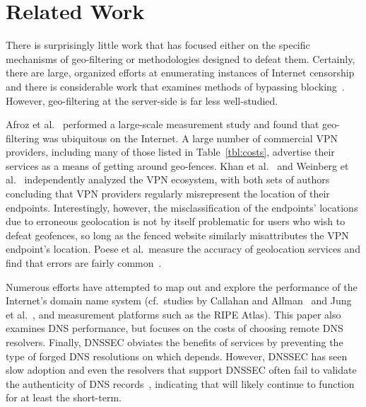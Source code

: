 \section{Related Work}

There is surprisingly little work that has focused either on the
specific mechanisms of geo-filtering or methodologies
designed to defeat them.  Certainly, there are large,
organized efforts at enumerating instances of Internet
censorship~\cite{encore,filasto2012ooni,echo-censorship} and there is
considerable work that examines methods of bypassing
blocking~\cite{tor,censorship-sok,censorship-empirical-study}.  However,
geo-filtering at the server-side is far less well-studied.

Afroz et al.~\cite{afroz2018exploring} performed a large-scale
measurement study and found that geo-filtering was ubiquitous on the
Internet.  A large number of commercial VPN providers, including many
of those listed in Table~\ref{tbl:costs}, advertise their services as
a means of getting around geo-fences.  Khan et
al.~\cite{vpn-ecosystem-imc2018} and Weinberg et
al.~\cite{proxies-geolocation-lying} independently analyzed the VPN
ecosystem, with both sets of authors concluding that VPN providers
regularly misrepresent the location of their endpoints.
Interestingly, however, the misclassification of the endpoints'
locations due to erroneous geolocation is not by itself problematic
for users who wish to defeat geofences, so long as the fenced website
similarly misattributes the VPN endpoint's location.  Poese et
al.~measure the accuracy of geolocation services and find that errors
are fairly common~\cite{ip-geolocation-unreliable}.

Numerous efforts have attempted to map out and explore the performance
of the Internet's domain name system (cf.~studies by Callahan and
Allman~\cite{callahan2013modern} and Jung et al.~\cite{jung2002dns},
and measurement platforms such as the RIPE Atlas).  This paper also
examines DNS performance, but focuses on the costs of choosing remote
DNS resolvers.  Finally, DNSSEC obviates the benefits of \sdns
services by preventing the type of forged DNS resolutions on which
\sdns depends.  However, DNSSEC has seen slow adoption and even the
resolvers that support DNSSEC often fail to validate the authenticity
of DNS records~\cite{dnssec-ecosystem}, indicating that \sdns will
likely continue to function for at least the short-term.



